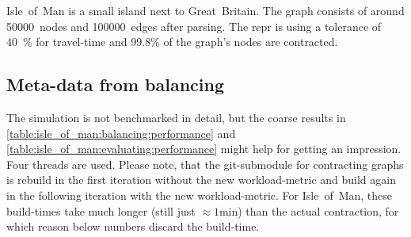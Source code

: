     Isle~of~Man is a small island next to Great~Britain.
    The graph consists of around \num{50000}~nodes and \num{100000}~edges after parsing.
    The \gls{repr} is using a tolerance of \si{40 \percent} for travel-time and $\si{\num{99.8} \percent}$ of the graph's nodes are contracted.

    \subsection{Meta-data from balancing}

        The simulation is not benchmarked in detail, but the coarse results in \vref{table:isle_of_man:balancing:performance} and \vref{table:isle_of_man:evaluating:performance} might help for getting an impression.
        Four threads are used.
        Please note, that the git-submodule for contracting graphs is rebuild in the first iteration without the new workload-\gls{metric} and build again in the following iteration with the new workload-\gls{metric}.
        For Isle~of~Man, these build-times take much longer (still just $\si{\approx 1 \minute}$) than the actual contraction, for which reason below numbers discard the build-time.
